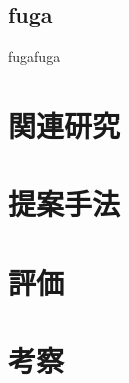 \documentclass[a4j,10pt]{jsarticle}
\begin{document}
\subsection{fuga}
fugafuga

\section{関連研究}

\section{提案手法}

\section{評価}

\section{考察}



\end{document}
